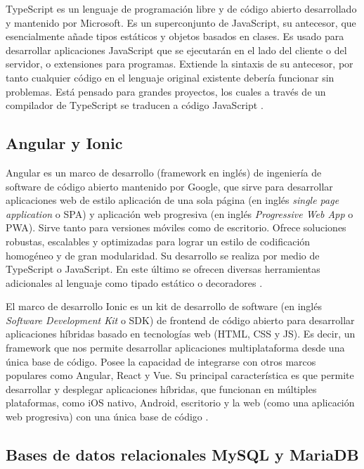 TypeScript es un lenguaje de programación libre y de código abierto desarrollado y mantenido por Microsoft. Es un superconjunto de JavaScript, su antecesor, que esencialmente añade tipos estáticos y objetos basados en clases. Es usado para desarrollar aplicaciones JavaScript que se ejecutarán en el lado del cliente o del servidor, o extensiones para programas. Extiende la sintaxis de su antecesor, por tanto cualquier código en el lenguaje original existente debería funcionar sin problemas. Está pensado para grandes proyectos, los cuales a través de un compilador de TypeScript se traducen a código JavaScript \citep{15}.

\subsection{Angular y Ionic}

Angular es un marco de desarrollo (framework en inglés) de ingeniería de software de código abierto mantenido por Google, que sirve para desarrollar aplicaciones web de estilo aplicación de una sola página (en inglés \textit{single page application} o SPA) y aplicación web progresiva (en inglés \textit{Progressive Web App} o PWA). Sirve tanto para versiones móviles como de escritorio. Ofrece soluciones robustas, escalables y optimizadas para lograr un estilo de codificación homogéneo y de gran modularidad. Su desarrollo se realiza por medio de TypeScript o JavaScript. En este último se ofrecen diversas herramientas adicionales al lenguaje como tipado estático o decoradores \citep{16}.

El marco de desarrollo Ionic es un kit de desarrollo de software (en inglés \textit{Software Development Kit} o SDK) de frontend de código abierto para desarrollar aplicaciones híbridas basado en tecnologías web (HTML, CSS y JS). Es decir, un framework que nos permite desarrollar aplicaciones multiplataforma desde una única base de código. Posee la capacidad de integrarse con otros marcos populares como Angular, React y Vue. Su principal característica es que permite desarrollar y desplegar aplicaciones híbridas, que funcionan en múltiples plataformas, como iOS nativo, Android, escritorio y la web (como una aplicación web progresiva) con una única base de código \citep{17}.

\subsection{Bases de datos relacionales MySQL y MariaDB}

